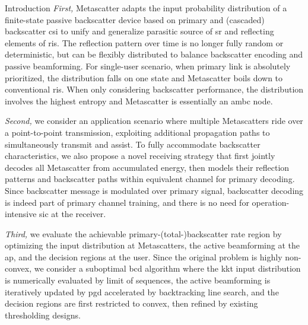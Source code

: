 \documentclass[journal]{IEEEtran}
\begin{document}
\begin{section}{Introduction}
	\emph{First,} Metascatter adapts the input probability distribution of a finite-state passive backscatter device based on primary and (cascaded) backscatter \gls{csi} to unify and generalize parasitic source of \gls{sr} and reflecting elements of \gls{ris}.
	The reflection pattern over time is no longer fully random or deterministic, but can be flexibly distributed to balance backscatter encoding and passive beamforming.
	For single-user scenario, when primary link is absolutely prioritized, the distribution falls on one state and Metascatter boils down to conventional \gls{ris}.
	When only considering backscatter performance, the distribution involves the highest entropy and Metascatter is essentially an \gls{ambc} node.

	\emph{Second,} we consider an application scenario where multiple Metascatters ride over a point-to-point transmission, exploiting additional propagation paths to simultaneously transmit and assist.
	To fully accommodate backscatter characteristics, we also propose a novel receiving strategy that first jointly decodes all Metascatter from accumulated energy, then models their reflection patterns and backscatter paths within equivalent channel for primary decoding.
	Since backscatter message is modulated over primary signal, backscatter decoding is indeed part of primary channel training, and there is no need for operation-intensive \gls{sic} at the receiver.


	\emph{Third,} we evaluate the achievable primary-(total-)backscatter rate region by optimizing the input distribution at Metascatters, the active beamforming at the \gls{ap}, and the decision regions at the user. Since the original problem is highly non-convex, we consider a suboptimal \gls{bcd} algorithm where the \gls{kkt} input distribution is numerically evaluated by limit of sequences, the active beamforming is iteratively updated by \gls{pgd} accelerated by backtracking line search, and the decision regions are first restricted to convex, then refined by existing thresholding designs.


\end{section}
\end{document}

